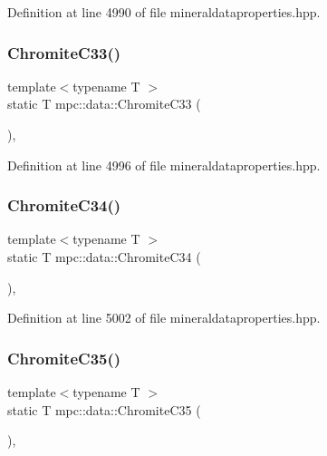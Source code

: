 Definition at line 4990 of file mineraldataproperties.\+hpp.

\mbox{\label{namespacempc_1_1data_a84fdca434fb3cd2bd76c5eec260e692e}} 
\subsubsection{\texorpdfstring{Chromite\+C33()}{ChromiteC33()}}
{\footnotesize\ttfamily template$<$typename T $>$ \\
static T mpc\+::data\+::\+Chromite\+C33 (\begin{DoxyParamCaption}{ }\end{DoxyParamCaption})\hspace{0.3cm}{\ttfamily [inline]}, {\ttfamily [static]}}



Definition at line 4996 of file mineraldataproperties.\+hpp.

\mbox{\label{namespacempc_1_1data_ad58444aaa7d5b45dbc5e1dfc146a07a9}} 
\subsubsection{\texorpdfstring{Chromite\+C34()}{ChromiteC34()}}
{\footnotesize\ttfamily template$<$typename T $>$ \\
static T mpc\+::data\+::\+Chromite\+C34 (\begin{DoxyParamCaption}{ }\end{DoxyParamCaption})\hspace{0.3cm}{\ttfamily [inline]}, {\ttfamily [static]}}



Definition at line 5002 of file mineraldataproperties.\+hpp.

\mbox{\label{namespacempc_1_1data_a0a6c5514d8208809899642d97cc565d3}} 
\subsubsection{\texorpdfstring{Chromite\+C35()}{ChromiteC35()}}
{\footnotesize\ttfamily template$<$typename T $>$ \\
static T mpc\+::data\+::\+Chromite\+C35 (\begin{DoxyParamCaption}{ }\end{DoxyParamCaption})\hspace{0.3cm}{\ttfamily [inline]}, {\ttfamily [static]}}



